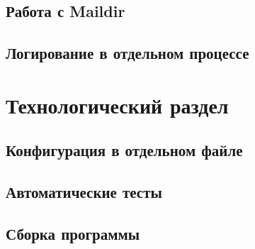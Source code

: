 \documentclass[a4paper,12pt]{report}
\begin{document}




\section{Работа с Maildir}

\section{Логирование в отдельном процессе}


\chapter{Технологический раздел}


\section{Конфигурация в отдельном файле}

\section{Автоматические тесты}

\section{Сборка программы}
\end{document}
